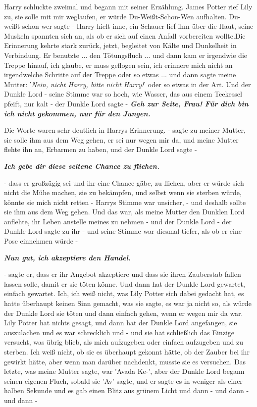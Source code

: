 Harry schluckte zweimal und begann mit seiner Erzählung. \glqq{}James Potter rief
Lily zu, sie solle mit mir weglaufen, er würde Du-Weißt-Schon-Wen aufhalten.
Du-weißt-schon-wer sagte -\grqq{} Harry hielt inne, ein Schauer lief ihm über
die Haut, seine Muskeln spannten sich an, als ob er sich auf einen Anfall
vorbereiten wollte.Die Erinnerung kehrte stark zurück, jetzt, begleitet von
Kälte und Dunkelheit in Verbindung. \glqq{}Er benutzte ... den Tötungsfluch ... und
dann kam er irgendwie die Treppe hinauf, ich glaube, er muss geflogen sein, ich
erinnere mich nicht an irgendwelche Schritte auf der Treppe oder so etwas ... und
dann sagte meine Mutter: '\emph{Nein, nicht Harry, bitte nicht Harry!}' oder so
etwas in der Art. Und der Dunkle Lord - seine Stimme war so hoch, wie Wasser,
das aus einem Teekessel pfeift, nur kalt - der Dunkle Lord sagte\grqq{} -
\textbf{}
\textbf{\emph{Geh zur Seite, Frau! Für dich bin ich nicht gekommen, nur für den
Jungen.}}

Die Worte waren sehr deutlich in Harrys Erinnerung. \glqq{}- sagte zu meiner
Mutter, sie solle ihm aus dem Weg gehen, er sei nur wegen mir da, und meine
Mutter flehte ihn an, Erbarmen zu haben, und der Dunkle Lord sagte -\grqq{}

\textbf{\emph{Ich gebe dir diese seltene Chance zu fliehen.} }

\glqq{}- dass er großzügig sei und ihr eine Chance gäbe, zu fliehen, aber er
würde sich nicht die Mühe machen, sie zu bekämpfen, und selbst wenn sie sterben
würde, könnte sie mich nicht retten -\grqq{} Harrys Stimme war unsicher, \glqq{}-
und deshalb sollte sie ihm aus dem Weg gehen. Und das war, als meine Mutter den
Dunklen Lord anflehte, ihr Leben anstelle meines zu nehmen - und der Dunkle Lord
- der Dunkle Lord sagte zu ihr - und seine Stimme war diesmal tiefer, als ob er
eine Pose einnehmen würde -\grqq{}

\textbf{\emph{Nun gut, ich akzeptiere den Handel.}}

\glqq{}- sagte er, dass er ihr Angebot akzeptiere und dass sie ihren Zauberstab
fallen lassen solle, damit er sie töten könne. Und dann hat der Dunkle Lord
gewartet, einfach gewartet. Ich, ich weiß nicht, was Lily Potter sich dabei
gedacht hat, es hatte überhaupt keinen Sinn gemacht, was sie sagte, es war ja
nicht so, als würde der Dunkle Lord sie töten und dann einfach gehen, wenn er
wegen mir da war. Lily Potter hat nichts gesagt, und dann hat der Dunkle Lord
angefangen, sie auszulachen und es war schrecklich und - und sie hat schließlich
das Einzige versucht, was übrig blieb, als mich aufzugeben oder einfach
aufzugeben und zu sterben. Ich weiß nicht, ob sie es überhaupt gekonnt hätte, ob
der Zauber bei ihr gewirkt hätte, aber wenn man darüber nachdenkt, musste sie es
versuchen. Das letzte, was meine Mutter sagte, war 'Avada Ke-', aber der Dunkle
Lord begann seinen eigenen Fluch, sobald sie 'Av' sagte, und er sagte es in
weniger als einer halben Sekunde und es gab einen Blitz aus grünem Licht und
dann - und dann - und dann -\grqq{}

